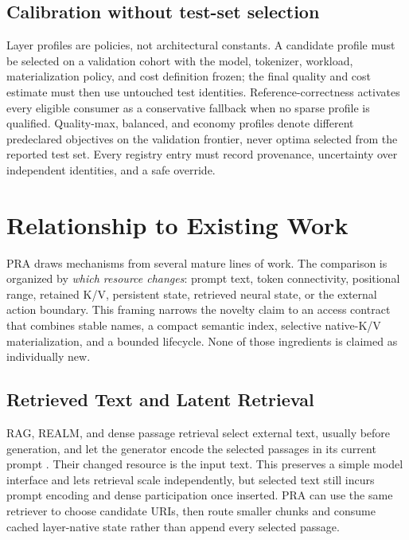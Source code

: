 \documentclass[11pt]{article}
\begin{document}
\subsection{Calibration without test-set selection}

Layer profiles are policies, not architectural constants. A candidate profile must be selected
on a validation cohort with the model, tokenizer, workload, materialization policy, and cost
definition frozen; the final quality and cost estimate must then use untouched test identities.
Reference-correctness activates every eligible consumer as a conservative fallback when no sparse
profile is qualified. Quality-max, balanced, and economy profiles denote different predeclared
objectives on the validation frontier, never optima selected from the reported test set. Every
registry entry must record provenance, uncertainty over independent identities, and a safe override.

\section{Relationship to Existing Work}

PRA draws mechanisms from several mature lines of work. The comparison is organized by
\emph{which resource changes}: prompt text, token connectivity, positional range, retained
K/V, persistent state, retrieved neural state, or the external action boundary. This framing
narrows the novelty claim to an access contract that combines stable names, a compact semantic
index, selective native-K/V materialization, and a bounded lifecycle. None of those ingredients
is claimed as individually new.

\subsection{Retrieved Text and Latent Retrieval}

RAG, REALM, and dense passage retrieval select external text, usually before generation, and
let the generator encode the selected passages in its current prompt
\cite{lewis2020rag,guu2020realm,karpukhin2020dpr}. Their changed resource is the input text.
This preserves a simple model interface and lets retrieval scale independently, but selected
text still incurs prompt encoding and dense participation once inserted. PRA can use the same
retriever to choose candidate URIs, then route smaller chunks and consume cached layer-native
state rather than append every selected passage.
\end{document}
